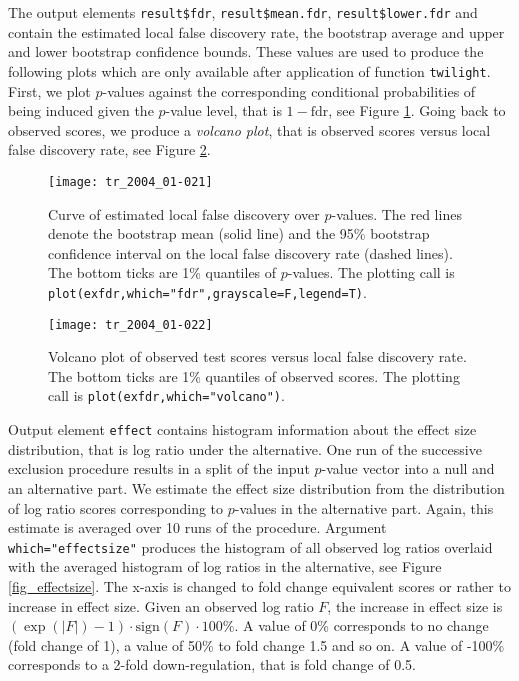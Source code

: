 \documentclass[11pt,a4paper,fleqn]{report}
\newcommand{\Robject}[1]{{\texttt{#1}}}
\newcommand{\Rfunction}[1]{{\texttt{#1}}}
\newcommand{\Rfunarg}[1]{{\texttt{#1}}}
\begin{document}
The output elements \Robject{result\$fdr}, \Robject{result\$mean.fdr}, \Robject{result\$lower.fdr} and \linebreak[5] \Robject{result\$upper.fdr} contain the estimated local false discovery rate, the bootstrap average and upper and lower bootstrap confidence bounds. These values are used to produce the following plots which are only available after application of function \Rfunction{twilight}. First, we plot $p$-values against the corresponding conditional probabilities of being induced given the $p$-value level, that is $1-\mbox{fdr}$, see Figure \ref{fig_fdr}. Going back to observed scores, we produce a \textit{volcano plot}, that is observed scores versus local false discovery rate, see Figure \ref{fig_volcano}.

\begin{figure}[t]
\begin{center}
\texttt{[image: tr\_2004\_01-021]}
\caption{Curve of estimated local false discovery over $p$-values. The red lines denote the bootstrap mean (solid line) and the 95\% bootstrap confidence interval on the local false discovery rate (dashed lines). The bottom ticks are 1\% quantiles of $p$-values. The plotting call is  \texttt{plot(exfdr,which="fdr",grayscale=F,legend=T)}.}\label{fig_fdr}
\end{center}
\end{figure}

\begin{figure}[t]
\begin{center}
\texttt{[image: tr\_2004\_01-022]}
\caption{Volcano plot of observed test scores versus local false discovery rate. The bottom ticks are 1\% quantiles of observed scores. The plotting call is \texttt{plot(exfdr,which="volcano")}.}\label{fig_volcano}
\end{center}
\end{figure}

Output element \Robject{effect} contains histogram information about the effect size distribution, that is log ratio under the alternative. One run of the successive exclusion procedure results in a split of the input $p$-value vector into a null and an alternative part. We estimate the effect size distribution from the distribution of log ratio scores corresponding to $p$-values in the alternative part. Again, this estimate is averaged over 10 runs of the procedure. Argument \Rfunarg{which="effectsize"} produces the histogram of all observed log ratios overlaid with the averaged histogram of log ratios in the alternative, see Figure \ref{fig_effectsize}. The x-axis is changed to fold change equivalent scores or rather to increase in effect size. Given an observed log ratio $F$, the increase in effect size is $(\exp (|F|)-1) \cdot \mbox{sign} (F) \cdot 100\%$. A value of 0\% corresponds to no change (fold change of 1), a value of 50\% to fold change 1.5 and so on. A value of -100\% corresponds to a 2-fold down-regulation, that is fold change of 0.5.
\end{document}
